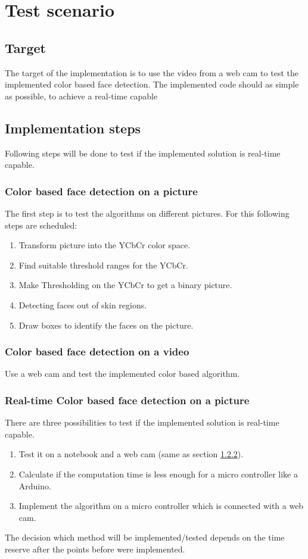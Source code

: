 \documentclass[Bachelorarbeit.tex]{subfiles}
\begin{document}
\chapter{Test scenario}
\section{Target}
The target of the implementation is to use the video from a web cam to test the implemented color based face detection. The implemented code should as simple as possible, to achieve a real-time capable 

\section{Implementation steps}
Following steps will be done to test if the implemented solution is real-time capable.

\subsection{Color based face detection on a picture}
The first step is to test the algorithms on different pictures. For this following steps are scheduled:
\begin{enumerate}
\item Transform picture into the YCbCr color space.
\item Find suitable threshold ranges for the YCbCr.
\item Make Thresholding on the YCbCr to get a binary picture.
\item Detecting faces out of skin regions.
\item Draw boxes to identify the faces on the picture.
\end{enumerate}
\subsection{Color based face detection on a video}\label{CbVidoe}
Use a web cam and test the implemented color based algorithm.
\subsection{Real-time Color based face detection on a picture}
There are three possibilities to test if the implemented solution is real-time capable.
\begin{enumerate}
\item Test it on a notebook and a web cam (same as section \ref{CbVidoe}).
\item Calculate if the computation time is less enough for a micro controller like a Arduino.
\item Implement the algorithm on a micro controller which is connected with a web cam.
\end{enumerate}
The decision which method will be implemented/tested depends on the time reserve after the points before were implemented.
\end{document}
